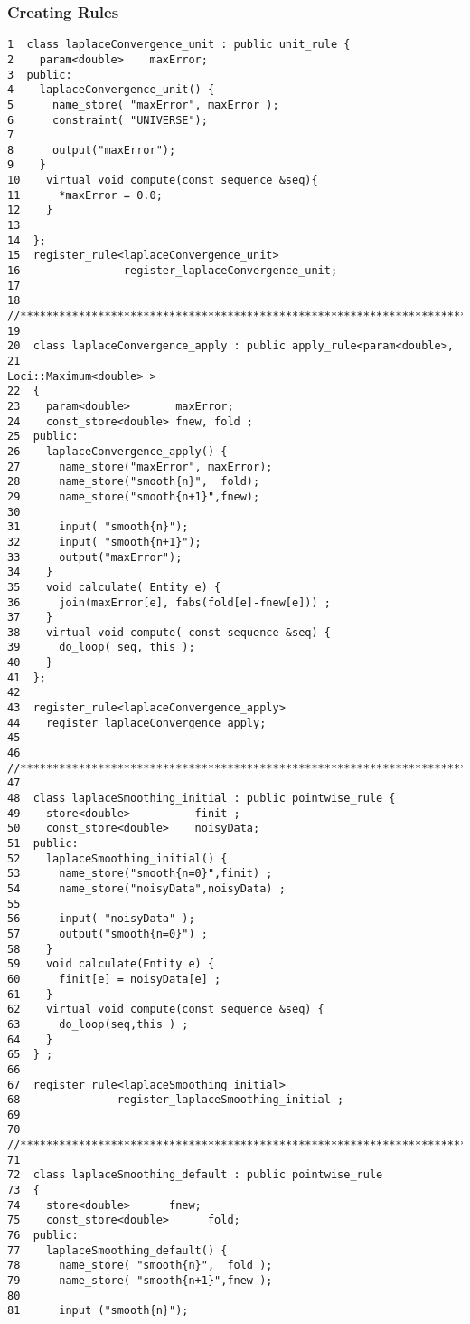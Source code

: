 \subsubsection { Creating Rules }
\begin{verbatim}
1  class laplaceConvergence_unit : public unit_rule {
2    param<double>    maxError;
3  public:
4    laplaceConvergence_unit() {
5      name_store( "maxError", maxError );
6      constraint( "UNIVERSE");
7
8      output("maxError");
9    }
10    virtual void compute(const sequence &seq){
11      *maxError = 0.0;
12    }
13
14  };
15  register_rule<laplaceConvergence_unit>
16                register_laplaceConvergence_unit;
17
18  //*********************************************************************
19
20  class laplaceConvergence_apply : public apply_rule<param<double>,
21                                                 Loci::Maximum<double> >
22  {
23    param<double>       maxError;
24    const_store<double> fnew, fold ;
25  public:
26    laplaceConvergence_apply() {
27      name_store("maxError", maxError);
28      name_store("smooth{n}",  fold);
29      name_store("smooth{n+1}",fnew);
30
31      input( "smooth{n}");
32      input( "smooth{n+1}");
33      output("maxError");
34    }
35    void calculate( Entity e) {
36      join(maxError[e], fabs(fold[e]-fnew[e])) ;
37    }
38    virtual void compute( const sequence &seq) {
39      do_loop( seq, this );
40    }
41  };
42
43  register_rule<laplaceConvergence_apply>
44    register_laplaceConvergence_apply;
45
46  //*********************************************************************
47
48  class laplaceSmoothing_initial : public pointwise_rule {
49    store<double>          finit ;
50    const_store<double>    noisyData;
51  public:
52    laplaceSmoothing_initial() {
53      name_store("smooth{n=0}",finit) ;
54      name_store("noisyData",noisyData) ;
55
56      input( "noisyData" );
57      output("smooth{n=0}") ;
58    }
59    void calculate(Entity e) {
60      finit[e] = noisyData[e] ;
61    }
62    virtual void compute(const sequence &seq) {
63      do_loop(seq,this ) ;
64    }
65  } ;
66
67  register_rule<laplaceSmoothing_initial>
68               register_laplaceSmoothing_initial ;
69
70  //*********************************************************************
71
72  class laplaceSmoothing_default : public pointwise_rule
73  {
74    store<double>      fnew;
75    const_store<double>      fold;
76  public:
77    laplaceSmoothing_default() {
78      name_store( "smooth{n}",  fold );
79      name_store( "smooth{n+1}",fnew );
80
81      input ("smooth{n}");

\end{verbatim}
